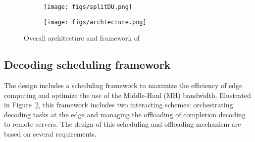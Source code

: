 
\begin{figure}[h!]
    \centering
    \begin{subfigure}[t]{0.9\textwidth} %
        \centering
        \texttt{[image: figs/splitDU.png]}
        \caption{}
        \label{fig:splitDU}
    \end{subfigure}
    \hfill
    \begin{subfigure}[t]{0.9\textwidth} %
        \centering
        \texttt{[image: figs/archtecture.png]}
        \caption{}
        \label{fig:scheduling}
    \end{subfigure}
    \caption{Overall architecture and framework of \Name{}} %
    \label{fig:architecture}
\end{figure}


\iffalse
\begin{figure}
\centering
  \texttt{[image: figs/splitDU.png]}
  \caption{\Name{} framework of scheduling and offloading}
  \label{fig:scheduling}
\end{figure}

\begin{figure}
\centering
  \texttt{[image: figs/archtecture.png]}
  \caption{\Name{} framework of scheduling and offloading}
  \label{fig:scheduling}
\end{figure}
\fi

\label{scheduling framework}
\subsection{Decoding scheduling framework}
The \Name{} design includes a scheduling framework to maximize the efficiency of edge computing and optimize the use of the Middle-Haul (MH) bandwidth. Illustrated in Figure~\ref{fig:scheduling}, this framework includes two interacting schemes: orchestrating decoding tasks at the edge and managing the offloading of completion decoding to remote servers. The design of this scheduling and offloading mechanism are based on several requirements.

